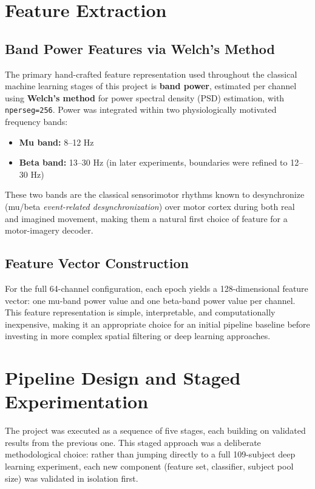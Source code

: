 \documentclass[11pt,a4paper]{article}
\newcommand{\code}[1]{\texttt{#1}}
\begin{document}
\section{Feature Extraction}

\subsection{Band Power Features via Welch's Method}
The primary hand-crafted feature representation used throughout the classical machine learning stages of this project is \textbf{band power}, estimated per channel using \textbf{Welch's method} for power spectral density (PSD) estimation, with \code{nperseg=256}. Power was integrated within two physiologically motivated frequency bands:

\begin{itemize}[leftmargin=1.5em]
    \item \textbf{Mu band:} 8--12 Hz
    \item \textbf{Beta band:} 13--30 Hz (in later experiments, boundaries were refined to 12--30 Hz)
\end{itemize}

These two bands are the classical sensorimotor rhythms known to desynchronize (mu/beta \emph{event-related desynchronization}) over motor cortex during both real and imagined movement, making them a natural first choice of feature for a motor-imagery decoder.

\subsection{Feature Vector Construction}
For the full 64-channel configuration, each epoch yields a 128-dimensional feature vector: one mu-band power value and one beta-band power value per channel. This feature representation is simple, interpretable, and computationally inexpensive, making it an appropriate choice for an initial pipeline baseline before investing in more complex spatial filtering or deep learning approaches.

\section{Pipeline Design and Staged Experimentation}

The project was executed as a sequence of five stages, each building on validated results from the previous one. This staged approach was a deliberate methodological choice: rather than jumping directly to a full 109-subject deep learning experiment, each new component (feature set, classifier, subject pool size) was validated in isolation first.
\end{document}
